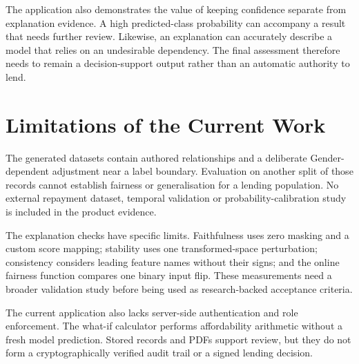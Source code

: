 The application also demonstrates the value of keeping confidence separate from explanation evidence. A high predicted-class probability can accompany a result that needs further review. Likewise, an explanation can accurately describe a model that relies on an undesirable dependency. The final assessment therefore needs to remain a decision-support output rather than an automatic authority to lend.

\section{Limitations of the Current Work}
The generated datasets contain authored relationships and a deliberate Gender-dependent adjustment near a label boundary. Evaluation on another split of those records cannot establish fairness or generalisation for a lending population. No external repayment dataset, temporal validation or probability-calibration study is included in the product evidence.

The explanation checks have specific limits. Faithfulness uses zero masking and a custom score mapping; stability uses one transformed-space perturbation; consistency considers leading feature names without their signs; and the online fairness function compares one binary input flip. These measurements need a broader validation study before being used as research-backed acceptance criteria.

The current application also lacks server-side authentication and role enforcement. The what-if calculator performs affordability arithmetic without a fresh model prediction. Stored records and PDFs support review, but they do not form a cryptographically verified audit trail or a signed lending decision.

